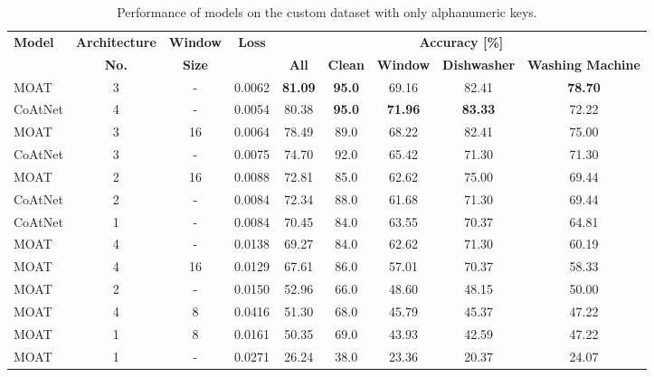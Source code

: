 \documentclass[a4paper,11pt,twoside]{report}
\theoremstyle{definition}
\begin{document}
\begin{table}[h!]
\centering
\caption{Performance of  models on the custom dataset with only alphanumeric keys.}
\begin{adjustbox}{max width=\textwidth}
\begin{tabular}{l|c|c|c|ccccc}
\hline
\textbf{Model} & \textbf{Architecture} & \textbf{Window} & \textbf{Loss} & \multicolumn{5}{c}{\textbf{Accuracy [\%]}} \\
\cline{5-9}
       &   \textbf{No.}  &   \textbf{Size}   &   & \textbf{All} & \textbf{Clean} & \textbf{Window} & \textbf{Dishwasher} & \textbf{Washing Machine}  \\
\hline
MOAT & 3 & - & 0.0062 & \textbf{81.09} & \textbf{95.0} & 69.16 & 82.41 & \textbf{78.70} \\
CoAtNet & 4 & - & 0.0054 & 80.38 & \textbf{95.0} & \textbf{71.96} & \textbf{83.33} & 72.22 \\
MOAT & 3 & 16 & 0.0064 & 78.49 & 89.0 & 68.22 & 82.41 & 75.00 \\
CoAtNet & 3 & - & 0.0075 & 74.70 & 92.0 & 65.42 & 71.30 & 71.30 \\
MOAT & 2 & 16 & 0.0088 & 72.81 & 85.0 & 62.62 & 75.00 & 69.44 \\
CoAtNet & 2 & - & 0.0084 & 72.34 & 88.0 & 61.68 & 71.30 & 69.44 \\
CoAtNet & 1 & - & 0.0084 & 70.45 & 84.0 & 63.55 & 70.37 & 64.81 \\
MOAT & 4 & - & 0.0138 & 69.27 & 84.0 & 62.62 & 71.30 & 60.19 \\
MOAT & 4 & 16 & 0.0129 & 67.61 & 86.0 & 57.01 & 70.37 & 58.33 \\
MOAT & 2 & - & 0.0150 & 52.96 & 66.0 & 48.60 & 48.15 & 50.00 \\
MOAT & 4 & 8 & 0.0416 & 51.30 & 68.0 & 45.79 & 45.37 & 47.22 \\
MOAT & 1 & 8 & 0.0161 & 50.35 & 69.0 & 43.93 & 42.59 & 47.22 \\
MOAT & 1 & - & 0.0271 & 26.24 & 38.0 & 23.36 & 20.37 & 24.07 \\
\hline
\end{tabular}
\end{adjustbox}
\end{table}
\end{document}
